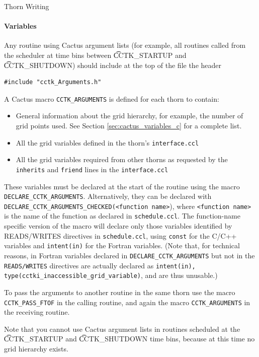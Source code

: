 \begin{cactuspart}{Thorn Writing}
\paragraph{Variables}

Any routine using Cactus argument lists (for example, all routines called from
the scheduler at time bins between {\t CCTK\_STARTUP} and {\t CCTK\_SHUTDOWN})
should include at the top of the file the header
\begin{verbatim}
#include "cctk_Arguments.h"
\end{verbatim}

A Cactus macro \texttt{CCTK\_ARGUMENTS} is defined for each thorn
to contain:
\begin{itemize}
\item General information about the grid hierarchy, for example, the number
      of grid points used. See Section \ref{sec:cactus_variables_c} for a
      complete list.
\item All the grid variables defined in the thorn's \texttt{interface.ccl}
\item All the grid variables required from other thorns as requested by
      the \texttt{inherits} and \texttt{friend} lines in the \texttt{interface.ccl}
\end{itemize}
These variables must be declared at the start of the routine using
the macro \texttt{DECLARE\_CCTK\_ARGUMENTS}. Alternatively, they can
be declared with \texttt{DECLARE\_CCTK\_ARGUMENTS\_CHECKED(<function name>}),
where \texttt{<function name>} is the name of the function as declared
in \texttt{schedule.ccl}. The function-name specific version of the macro
will declare only those variables identified by READS/WRITES directives
in \texttt{schedule.ccl}, using \texttt{const} for the C/C++ variables
and \texttt{intent(in)} for the Fortran variables. (Note that, for technical
reasons, in Fortran variables declared in \texttt{DECLARE\_CCTK\_ARGUMENTS}
but not in the \texttt{READS/WRITES} directives are actually declared as
\texttt{intent(in), type(cctki\_inaccessible\_grid\_variable)}, and are thus
unusable.)

To pass the arguments to another routine in the same thorn use the macro
\texttt{CCTK\_PASS\_FTOF} in the calling routine, and again the macro
\texttt{CCTK\_ARGUMENTS} in the receiving routine.

Note that you cannot use Cactus argument lists in routines scheduled at the
{\t CCTK\_STARTUP} and {\t CCTK\_SHUTDOWN} time bins, because at this time
no grid hierarchy exists.



\end{cactuspart}
